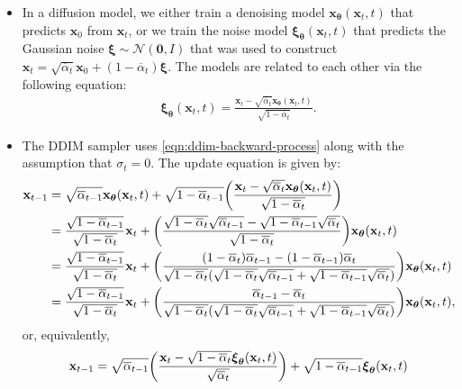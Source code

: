 \documentclass[10pt]{article}
\newcommand{\ve}[1]{\mathbf{#1}}
\newcommand{\ves}[1]{\boldsymbol{#1}}
\newcommand{\mcal}[1]{\mathcal{#1}}
\newcommand{\ov}[1]{\overline{#1}}
\begin{document}
\begin{itemize}
  \item In a diffusion model, we either train a denoising model $\ve{x}_{\ves{\theta}}(\ve{x}_t, t)$ that predicts $\ve{x}_0$ from $\ve{x}_t$, or we train the noise model $\ves{\xi}_{\ves{\theta}}(\ve{x}_t, t)$ that predicts the Gaussian noise $\ves{\xi} \sim \mcal{N}(\ve{0},I)$ that was used to construct $\ve{x}_t = \sqrt{\ov{\alpha}_t} \ve{x}_0 + (1 - \ov{\alpha}_t) \ves{\xi}$. The models are related to each other via the following equation:
  \begin{align} \label{eqn:noise-and-denoised}
    \ves{\xi}_{\ves{\theta}}(\ve{x}_t, t) = \frac{\ve{x}_t - \sqrt{\ov{\alpha}_t}\ve{x}_{\ves{\theta}}(\ve{x}_t, t)}{\sqrt{1 - \ov{\alpha}_t}}.
  \end{align}

  \item The DDIM sampler uses \eqref{eqn:ddim-backward-process} along with the assumption that $\sigma_t = 0$. The update equation is given by:
  \begin{align}
    \ve{x}_{t-1} 
    &= \sqrt{\ov{\alpha}_{t-1}}\ve{x}_{\ves{\theta}}(\ve{x}_t, t) + \sqrt{1 - \ov{\alpha}_{t-1}} \bigg( \frac{\ve{x}_t - \sqrt{\ov{\alpha}_t}\ve{x}_{\ves{\theta}}(\ve{x}_t, t)}{\sqrt{1 - \ov{\alpha}_t}} \bigg) \notag \\
    &= \frac{\sqrt{1-\ov{\alpha}_{t-1}}}{\sqrt{1-\ov{\alpha}_t}} \ve{x}_t  
    + \bigg( \frac{\sqrt{1-\ov{\alpha}_{t}}\sqrt{\ov{\alpha}_{t-1}} - \sqrt{1-\ov{\alpha}_{t-1}}\sqrt{\ov{\alpha}_t} }{\sqrt{1-\ov{\alpha}_t}} \bigg) \ve{x}_{\ves{\theta}}(\ve{x}_t, t) \notag \\
    &= \frac{\sqrt{1-\ov{\alpha}_{t-1}}}{\sqrt{1-\ov{\alpha}_t}} \ve{x}_t  
    + \bigg(  \frac{ (1-\ov{\alpha}_{t})\ov{\alpha}_{t-1} - (1-\ov{\alpha}_{t-1})\ov{\alpha}_t }{\sqrt{1-\ov{\alpha}_t}(\sqrt{1-\ov{\alpha}_{t}}\sqrt{\ov{\alpha}_{t-1}} + \sqrt{1-\ov{\alpha}_{t-1}}\sqrt{\ov{\alpha}_t}) } \bigg) \ve{x}_{\ves{\theta}}(\ve{x}_t, t) \notag \\
    &= \frac{\sqrt{1-\ov{\alpha}_{t-1}}}{\sqrt{1-\ov{\alpha}_t}} \ve{x}_t  
    + \bigg(  \frac{ \ov{\alpha}_{t-1} - \ov{\alpha}_t }{\sqrt{1-\ov{\alpha}_t}(\sqrt{1-\ov{\alpha}_{t}}\sqrt{\ov{\alpha}_{t-1}} + \sqrt{1-\ov{\alpha}_{t-1}}\sqrt{\ov{\alpha}_t}) } \bigg) \ve{x}_{\ves{\theta}}(\ve{x}_t, t), \label{eqn:ddim-update-equation-denoised}
  \end{align}
  or, equivalently,
  \begin{align} 
    \ve{x}_{t-1} 
    &= \sqrt{\ov{\alpha}_{t-1}} \bigg( \frac{\ve{x}_t - \sqrt{1 - \ov{\alpha}_t} \ves{\xi}_{\ves{\theta}}(\ve{x}_t, t) }{\sqrt{\ov{\alpha}_t}} \bigg) + \sqrt{1 - \ov{\alpha}_{t-1}} \ves{\xi}_{\ves{\theta}}(\ve{x}_t, t) \notag \\

\end{align}
\end{itemize}
\end{document}
